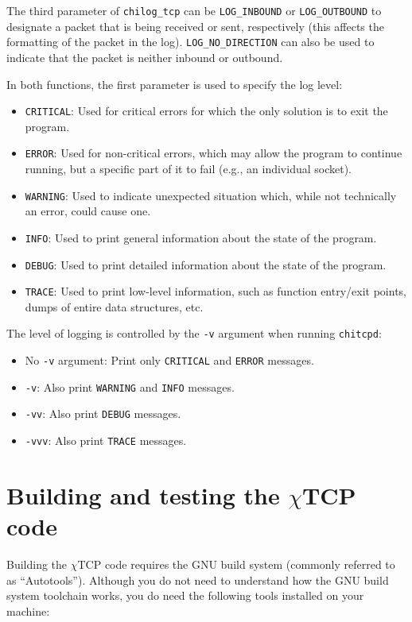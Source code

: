 \documentclass[10pt]{article}
\newcommand{\chitcp}{$\chi$\textsf{TCP} }
\begin{document}
The third parameter of \texttt{chilog\_tcp} can be \texttt{LOG\_INBOUND} or \texttt{LOG\_OUTBOUND} to designate a packet that is being received or sent, respectively (this affects the formatting of the packet in the log). \texttt{LOG\_NO\_DIRECTION} can also be used to indicate that the packet is neither inbound or outbound.

In both functions, the first parameter is used to specify the log level:

\begin{itemize}
 \item \texttt{CRITICAL}: Used for critical errors for which the only solution is to exit the program.
 \item \texttt{ERROR}: Used for non-critical errors, which may allow the program to continue running, but a specific part of it to fail (e.g., an individual socket).
 \item \texttt{WARNING}: Used to indicate unexpected situation which, while not technically an error, could cause one.
 \item \texttt{INFO}: Used to print general information about the state of the program.
 \item \texttt{DEBUG}: Used to print detailed information about the state of the program.
 \item \texttt{TRACE}: Used to print low-level information, such as function entry/exit points, dumps of entire data structures, etc.
\end{itemize}

The level of logging is controlled by the \texttt{-v} argument when running \texttt{chitcpd}:

\begin{itemize}
 \item No \texttt{-v} argument: Print only \texttt{CRITICAL} and \texttt{ERROR} messages.
 \item \texttt{-v}: Also print \texttt{WARNING} and \texttt{INFO} messages.
 \item \texttt{-vv}: Also print \texttt{DEBUG} messages.
 \item \texttt{-vvv}: Also print \texttt{TRACE} messages.
\end{itemize}

\section{Building and testing the \chitcp code}
\label{sec:build}

Building the \chitcp code requires the GNU build system (commonly referred to as ``Autotools''). Although you do not need to understand how the GNU build system toolchain works, you do need the following tools installed on your machine:
\end{document}
